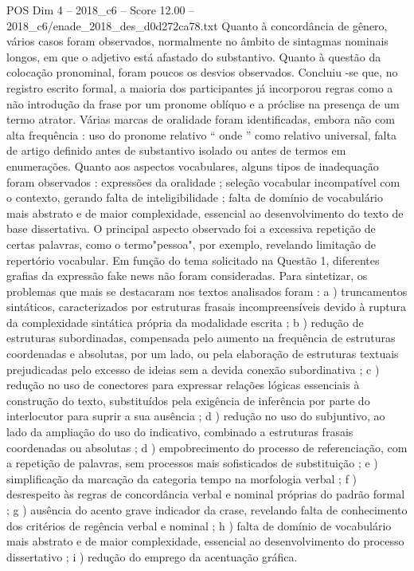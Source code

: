 \begin{textsample}{POS Dim 4 – 2018\_c6 – Score 12.00 – 2018\_c6/enade\_2018\_des\_d0d272ca78.txt}
Quanto à concordância de gênero, vários casos foram observados, normalmente no âmbito de sintagmas nominais longos, em que o adjetivo está afastado do substantivo.
Quanto à questão da colocação pronominal, foram poucos os desvios observados.
Concluiu -se que, no registro escrito formal, a maioria dos participantes já incorporou regras como a não introdução da frase por um pronome oblíquo e a próclise na presença de um termo atrator.
Várias marcas de oralidade foram identificadas, embora não com alta frequência : uso do pronome relativo “ onde ” como relativo universal, falta de artigo definido antes de substantivo isolado ou antes de termos em enumerações.
Quanto aos aspectos vocabulares, alguns tipos de inadequação foram observados : expressões da oralidade ; seleção vocabular incompatível com o contexto, gerando falta de inteligibilidade ; falta de domínio de vocabulário mais abstrato e de maior complexidade, essencial ao desenvolvimento do texto de base dissertativa.
O principal aspecto observado foi a excessiva repetição de certas palavras, como o termo"pessoa", por exemplo, revelando limitação de repertório vocabular.
Em função do tema solicitado na Questão 1, diferentes grafias da expressão fake news não foram consideradas.
Para sintetizar, os problemas que mais se destacaram nos textos analisados foram : a ) truncamentos sintáticos, caracterizados por estruturas frasais incompreensíveis devido à ruptura da complexidade sintática própria da modalidade escrita ; b ) redução de estruturas subordinadas, compensada pelo aumento na frequência de estruturas coordenadas e absolutas, por um lado, ou pela elaboração de estruturas textuais prejudicadas pelo excesso de ideias sem a devida conexão subordinativa ; c ) redução no uso de conectores para expressar relações lógicas essenciais à construção do texto, substituídos pela exigência de inferência por parte do interlocutor para suprir a sua ausência ; d ) redução no uso do subjuntivo, ao lado da ampliação do uso do indicativo, combinado a estruturas frasais coordenadas ou absolutas ; d ) empobrecimento do processo de referenciação, com a repetição de palavras, sem processos mais sofisticados de substituição ; e ) simplificação da marcação da categoria tempo na morfologia verbal ; f ) desrespeito às regras de concordância verbal e nominal próprias do padrão formal ; g ) ausência do acento grave indicador da crase, revelando falta de conhecimento dos critérios de regência verbal e nominal ; h ) falta de domínio de vocabulário mais abstrato e de maior complexidade, essencial ao desenvolvimento do processo dissertativo ; i ) redução do emprego da acentuação gráfica.

\end{textsample}
